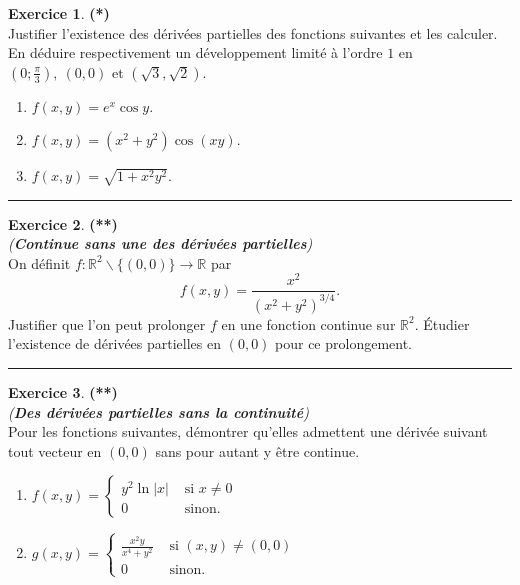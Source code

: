 \documentclass[a4paper,11pt]{article}
\theoremstyle{definition}
\newtheorem{exo}{Exercice} %
\begin{document}
\begin{minipage}{1\linewidth}\begin{minipage}[t]{0.48\linewidth}\raggedright
		
		\begin{exo}\textbf{(*)}\quad\\[0.1cm]
			Justifier l'existence des dérivées partielles des fonctions suivantes et les calculer. En déduire respectivement un développement limité à l'ordre $1$ en $(0;\frac{\pi}{3}) , \ (0,0) \text{ et } (\sqrt{3},\sqrt{2})$. 
			\begin{enumerate}
				\item $f(x,y)=e^x\cos y.$
				\item $f(x,y)=(x^2+y^2)\cos(xy).$
				\item $f(x,y)=\sqrt{1+x^2y^2}.$
			\end{enumerate}
			
			
			\centering\rule{1\linewidth}{0.6pt}\end{exo}
		
		
		
		\begin{exo}\textbf{(**)}\quad\\\textit{(\textbf{Continue sans une des dérivées partielles})}\\[0.1cm]
			On définit $f:\mathbb R^2\backslash\{(0,0)\}\to\mathbb R$ par 
			$$f(x,y)=\frac{x^2}{(x^2+y^2)^{3/4}}.$$
			Justifier que l'on peut prolonger $f$ en une fonction continue sur $\mathbb R^2$. \'Etudier l'existence de dérivées partielles en $(0,0)$ pour ce prolongement.
			
			\centering\rule{1\linewidth}{0.6pt}\end{exo}
		
		\begin{exo}\textbf{(**)}\quad\\\textit{(\textbf{Des dérivées partielles sans la continuité})}\\[0.1cm]
			Pour les fonctions suivantes, démontrer qu'elles admettent une dérivée suivant tout vecteur en $(0,0)$ sans pour autant y être continue.
			\begin{enumerate}
				\item $\displaystyle f(x,y)=\left\{
				\begin{array}{ll}
				y^2\ln |x|&\textrm{ si }x\neq 0\\
				0&\textrm{ sinon.}
				\end{array}
				\right.
				$
				\item $\displaystyle g(x,y)=\left\{
				\begin{array}{ll}
				\frac{x^2y}{x^4+y^2}&\textrm{ si }(x,y)\neq (0,0)\\
				0&\textrm{ sinon.}
				\end{array}
				\right.
				$
			\end{enumerate}
			

\end{exo}
\end{minipage}
\end{minipage}
\end{document}

